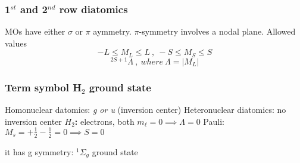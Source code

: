\documentclass[a4paper,titlepage]{article}
\begin{document}
\begin{frame}
\end{frame}

\begin{frame}
\frametitle{1\(^{st}\) and 2\(^{nd}\) row diatomics}
MOs have either \(\sigma\) or \(\pi\) aymmetry. \(\pi\)-symmetry involves a nodal plane.\newline
Allowed values
\[ -L \leqslant M_L \leqslant L \ ,\ -S \leqslant M_S \leqslant S\]
\medskip
\[ ^{2S+1}\Lambda\ ,\ where\  \Lambda = |M_L|\]
\bigskip\bigskip
\centering{}
\end{frame}

\begin{frame}
\frametitle{Term symbol H\(_2\) ground state}
Homonuclear datomics: \emph{g or u} (inversion center)\newline\bigskip
Heteronuclear diatomics: no inversion center\newline\bigskip
\textbf{\(H_2\):} electrons, both \(m_\ell=0 \implies \Lambda = 0\)\newline
\enspace Pauli: \(M_s = +\frac{1}{2} -\frac{1}{2} = 0 \implies S=0\)\newline\par
\quad it has g symmetry: \(^1\Sigma_g\) ground state \newline
\end{frame}
\end{document}
